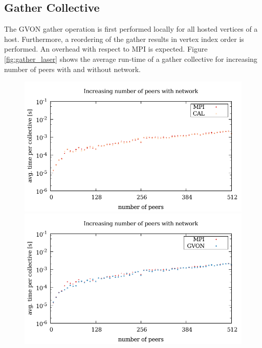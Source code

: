 \subsection*{Gather Collective}
The GVON gather operation is first performed locally for all hosted
vertices of a host. Furthermore, a reordering of the gather results in
vertex index order is performed. An overhead with respect to MPI is
expected.  Figure \ref{fig:gather_laser} shows the average run-time of
a gather collective for increasing number of peers with and without
network.

\begin{figure}[H]
  \begin{minipage}[t]{0.5\textwidth}
    \includegraphics[width=\textwidth]{plots/50_collective_network_cal_laser}
    \includegraphics[width=\textwidth]{plots/50_collective_network_gvon_laser}
  \end{minipage}%
  \begin{minipage}[t]{0.5\textwidth}

\end{minipage}
\end{figure}
